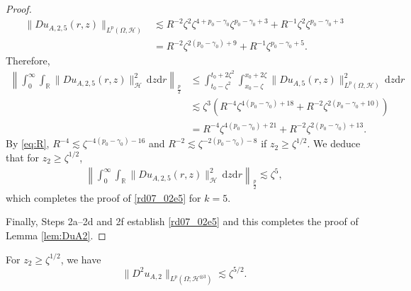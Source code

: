 \documentclass[12pt,a4paper]{article}
\newcommand{\R}{{\mathbb{R}}}
\renewcommand{\d}{\mathrm{d}}
\newcommand {\deltah}{{\zeta}}
\newcommand{\<}{\langle}
\renewcommand{\>}{\rangle}
\begin{document}
\begin{proof}
\begin{align*}
          \|Du_{A,2,5}(r,z)\|_{L^{p}(\Omega,\mathcal{H})} &\lesssim R^{-2} \deltah^2 \deltah^{4 + p_0 - \gamma_0} \deltah^{p_0 - \gamma_0 +3} + R^{-1} \deltah^2 \deltah^{p_0 - \gamma_0 +3}\\
           &= R^{-2}\deltah^{2(p_0-\gamma_0)+9} + R^{-1}\deltah^{p_0-\gamma_0+5}.
\end{align*}
Therefore, 
\begin{align}\nonumber
  \left\|\int_0^\infty\int_\R \|Du_{A,2,5}(r,z)\|_\mathcal{H}^2 \, \d z\d r\right\|_{\frac p2} &  \leq \int_{t_0-\deltah^2}^{t_0+2\deltah^2}\int_{x_0-\deltah}^{x_0+2\deltah} \|Du_{A,5}(r,z)\|_{L^p(\Omega, \mathcal{H})}^2 \, \d z\d r\\ \nonumber
     & \lesssim  \deltah^3 (R^{-4} \deltah^{4 (p_0 - \gamma_0) + 18} + R^{-2} \deltah^{2 (p_0 - \gamma_0 + 10)} ) \\
           &= R^{-4}\deltah^{4(p_0-\gamma_0)+21} + R^{-2}\deltah^{2(p_0-\gamma_0)+13}.
 \label{rd07_02e9}
 \end{align}
By \eqref{eq:R},  $R^{-4}\lesssim \deltah^{-4(p_0-\gamma_0)-16}$ and $R^{-2}\lesssim \deltah^{-2(p_0-\gamma_0)-8}$
           if $z_2\geq \deltah^{1/2}$. We deduce that for $z_2\geq \deltah^{1/2}$,
\begin{align} \label{rd08_06e2}
           \left\|\int_0^\infty\int_\R \|Du_{A,2,5}(r,z)\|_\mathcal{H}^2 \, \d z\d r\right\|_{\frac p2} \lesssim \deltah^{5},
\end{align}
           which completes the proof of \eqref{rd07_02e5} for $k=5$.
           
           Finally, %
  Steps 2a--2d and 2f establish \eqref{rd07_02e5} and this completes the proof of Lemma \ref{lem:DuA2}.
 \end{proof}
 
  \begin{lemma}\label{D2u_A2}
             For $z_2\geq \deltah^{1/2}$,  we have
             \begin{equation} \label{D2UA2}
              \|D^2u_{A,2}\|_{L^p(\Omega;\mathcal{H}^{\otimes3})} \lesssim \deltah^{5/2}.
 \end{equation}
 \end{lemma}
 
\end{document}

